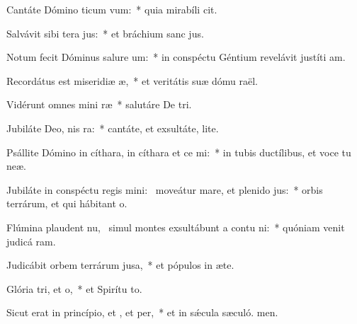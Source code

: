 \item Cantáte Dómino ticum vum:~* quia mirabíli cit.
\item Salvávit sibi tera jus:~* et bráchium sanc jus.
\item Notum fecit Dóminus salure um:~* in conspéctu Géntium revelávit justíti am.
\item Recordátus est miseridiæ æ,~* et veritátis suæ dómu raël.
\item Vidérunt omnes mini ræ~* salutáre De tri.
\item Jubiláte Deo, nis ra:~* cantáte, et exsultáte,  lite.
\item Psállite Dómino in cíthara, in cíthara et ce mi:~* in tubis ductílibus, et voce tu neæ.
\item Jubiláte in conspéctu regis mini:~\pscross{} moveátur mare, et plenido jus:~* orbis terrárum, et qui hábitant  o.
\item Flúmina plaudent nu,~\pscross{} simul montes exsultábunt a contu ni:~* quóniam venit judicá ram.
\item Judicábit orbem terrárum  jusa,~* et pópulos in æte.
\item Glória tri, et o,~* et Spirítu to.
\item Sicut erat in princípio, et , et per,~* et in sǽcula sæculó. men.
